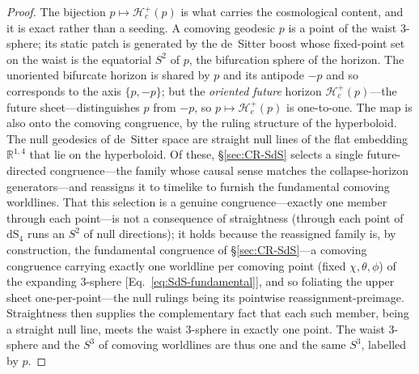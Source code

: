 \documentclass[11pt,a4paper]{article}
\theoremstyle{plain}
\theoremstyle{definition}
\theoremstyle{remark}
\begin{document}
\begin{proof}
The bijection $p\mapsto\mathcal{H}_c^{+}(p)$ is what carries the cosmological content, and it is exact rather than a seeding. A comoving geodesic $p$ is a point of the waist $3$-sphere; its static patch is generated by the de~Sitter boost whose fixed-point set on the waist is the equatorial $S^2$ of $p$, the bifurcation sphere of the horizon. The unoriented bifurcate horizon is shared by $p$ and its antipode $-p$ and so corresponds to the axis $\{p,-p\}$; but the \emph{oriented future} horizon $\mathcal{H}_c^{+}(p)$---the future sheet---distinguishes $p$ from $-p$, so $p\mapsto\mathcal{H}_c^{+}(p)$ is one-to-one. The map is also onto the comoving congruence, by the ruling structure of the hyperboloid. The null geodesics of de~Sitter space are straight null lines of the flat embedding $\mathbb{R}^{1,4}$ that lie on the hyperboloid. Of these, \S\ref{sec:CR-SdS} selects a single future-directed congruence---the family whose causal sense matches the collapse-horizon generators---and reassigns it to timelike to furnish the fundamental comoving worldlines. That this selection is a genuine congruence---exactly one member through each point---is not a consequence of straightness (through each point of $\mathrm{dS}_4$ runs an $S^2$ of null directions); it holds because the reassigned family is, by construction, the fundamental congruence of \S\ref{sec:CR-SdS}---a comoving congruence carrying exactly one worldline per comoving point (fixed $\chi,\theta,\phi$) of the expanding $3$-sphere [Eq.~\eqref{eq:SdS-fundamental}], and so foliating the upper sheet one-per-point---the null rulings being its pointwise reassignment-preimage. Straightness then supplies the complementary fact that each such member, being a straight null line, meets the waist $3$-sphere in exactly one point. The waist $3$-sphere and the $S^3$ of comoving worldlines are thus one and the same $S^3$, labelled by $p$.


\end{proof}
\end{document}
